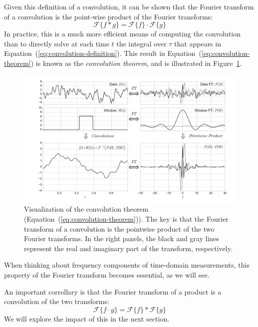 \documentclass[preprint]{aastex}
\newcommand{\fig}[1]{Figure~\ref{fig:#1}}
\newcommand{\figlabel}[1]{\label{fig:#1}}
\newcommand{\Eq}[1]{Equation~(\ref{eq:#1})}
\newcommand{\eq}[1]{\Eq{#1}}
\newcommand{\eqlabel}[1]{\label{eq:#1}}
\begin{document}
Given this definition of a convolution, it can be shown that the Fourier transform of a convolution is the point-wise product of the Fourier transforms:
\begin{equation}
  \mathcal{F}\{f \ast g\} = \mathcal{F}\{f\} \cdot \mathcal{F}\{g\}
  \eqlabel{convolution-theorem}
\end{equation}
In practice, this is a much more efficient means of computing the convolution
than to directly solve at each time $t$ the integral over $\tau$ that appears
in \eq{convolution-definition}.
This result in \eq{convolution-theorem} is known as the
{\it convolution theorem}, and is illustrated in \fig{convolution-theorem}.
\begin{figure}[ht]
  \centering
  \includegraphics[width=\textwidth]{fig05_Convolution_Theorem}
  \caption{Visualization of the convolution theorem (\eq{convolution-theorem}).
    The key is that the Fourier transform of
    a convolution is the pointwise product of the two Fourier transforms.
    In the right panels, the black and gray lines represent the real and
    imaginary part of the transform, respectively.
    \figlabel{convolution-theorem}}
\end{figure}
When thinking about frequency components of time-domain measurements, this
property of the Fourier transform becomes essential, as we will see.

An important corrollary is that the Fourier transform of a product is a convolution of the two transforms:
\begin{equation}
  \mathcal{F}\{f \cdot g\} = \mathcal{F}\{f\} \ast \mathcal{F}\{g\}
  \eqlabel{convolution-theorem-inverse}
\end{equation}
We will explore the impact of this in the next section.
\end{document}
